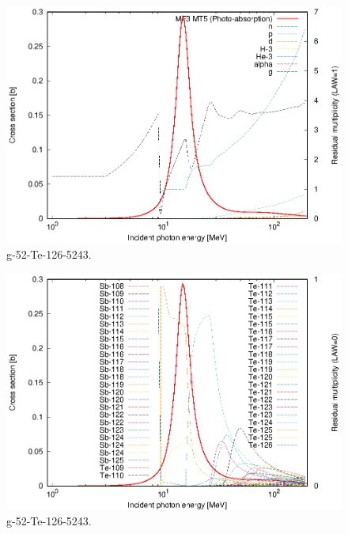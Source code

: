 \begin{figure}
 \includegraphics[width=\linewidth]{eps/g_52-Te-126_5243.eps}
  \caption{g-52-Te-126-5243.}
\end{figure}
\begin{figure}
 \includegraphics[width=\linewidth]{eps-law0/g_52-Te-126_5243.eps}
 \caption{g-52-Te-126-5243.}
\end{figure}
\newpage \clearpage


